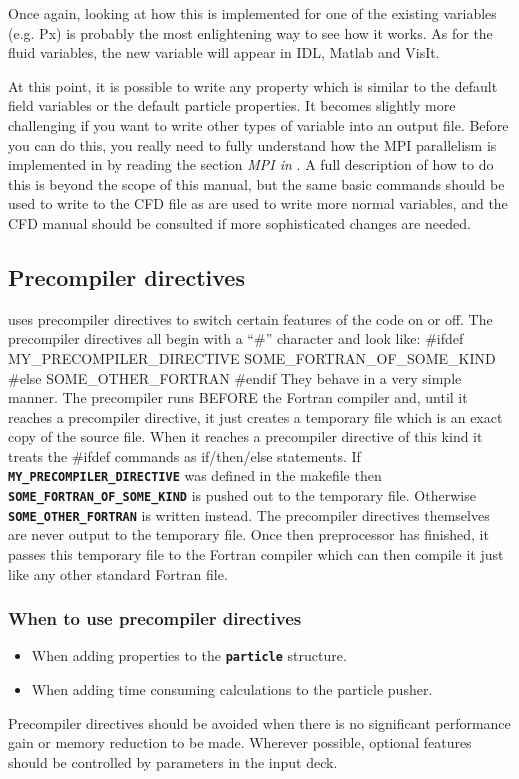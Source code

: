 \documentclass[12pt,a4paper]{article}
\newcommand{\inlinecode}[1]{{\color{warwickred} \bf\texttt{#1}}}
\newcommand{\EPOCH}{{\color{warwickdark}\fontfamily{phv}\selectfont{EPOCH}}}
\newenvironment{boxverbatim}{\lboxverbatim{none}}{\endlboxverbatim}
\begin{document}
Once again, looking at how this is implemented for one of the existing
variables (e.g. Px) is probably the most enlightening way to see how it
works. As for the fluid variables, the new variable will appear in IDL, Matlab
and VisIt.

At this point, it is possible to write any property which is similar to the
default field variables or the default particle properties. It becomes slightly
more challenging if you want to write other types of variable into an output
file. Before you can do this, you really need to fully understand how the MPI
parallelism is implemented in {\EPOCH} by reading the section {\it MPI in
{\EPOCH}}. A full description of how to do this is beyond the scope of this
manual, but the same basic commands should be used to write to the CFD file as
are used to write more normal variables, and the CFD manual should be consulted
if more sophisticated changes are needed.

\pagebreak

\subsection{Precompiler directives}
{\EPOCH} uses precompiler directives to switch certain features of the code on
or off. The precompiler directives all begin with a ``\#'' character and look
like:
\begin{boxverbatim}
#ifdef MY_PRECOMPILER_DIRECTIVE
  SOME_FORTRAN_OF_SOME_KIND
#else
  SOME_OTHER_FORTRAN
#endif
\end{boxverbatim}
They behave in a very simple manner. The precompiler runs BEFORE the
Fortran compiler and, until it reaches a precompiler directive, it just creates
a temporary file which is an exact copy of the source file. When it reaches a
precompiler directive of this kind it treats the \#ifdef commands as
if/then/else statements. If
\inlinecode{MY\_PRECOMPILER\_DIRECTIVE} was defined in the makefile then
\inlinecode{SOME\_FORTRAN\_OF\_SOME\_KIND} is pushed out to the temporary
file. Otherwise \inlinecode{SOME\_OTHER\_FORTRAN} is written instead.
The precompiler directives themselves are never output to the temporary
file. Once then preprocessor has finished, it passes this temporary file
to the Fortran compiler which can then compile it just like any other
standard Fortran file.

\subsubsection{When to use precompiler directives}
\begin{itemize}
\item When adding properties to the \inlinecode{particle} structure.
\item When adding time consuming calculations to the particle pusher.
\end{itemize}
Precompiler directives should be avoided when there is no significant
performance gain or memory reduction to be made. Wherever possible, optional
features should be controlled by parameters in the input deck.
\end{document}
